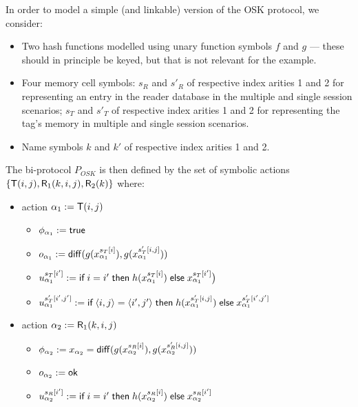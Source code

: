 \begin{example}[OSK]
  \label{ex:osk-bi-process}
  In order to model a simple (and linkable) version of the OSK protocol,
  we consider:
  \begin{itemize}
    \item Two hash functions modelled using unary function symbols 
      $f$ and $g$ --- these should in principle be keyed, but that is
      not relevant for the example.
    \item Four memory cell symbols:
      $s_R$ and $s'_R$ of respective index arities 1 and 2 for representing
      an entry in the reader database in the multiple and single session 
      scenarios;
      $s_T$ and $s'_T$ of respective index arities 1 and 2 for representing
      the tag's memory in multiple and single session scenarios.
    \item Name symbols $k$ and $k'$ of respective index arities 1 and 2.
  \end{itemize}
  The bi-protocol $P_{OSK}$ is then defined by
  the set of symbolic actions $\{\textsf{T}(i,j),\textsf{R}_1(k,i,j),\textsf{R}_2(k)\}$ where:
    \begin{itemize}
      \item action $\alpha_1 := \textsf{T}(i,j)$
        \begin{itemize}
          \item $\phi_{\alpha_1} := \textsf{true}$
          \item $o_{\alpha_1} := \mathsf{diff}(g(x_{\alpha_1}^{s_T[i]}),g(x_{\alpha_1}^{s'_T[i,j]}))$
          \item $u_{\alpha_1}^{s_T[i']} :=
              \textsf{if}\; i=i' \;\textsf{then}\; h(x_{\alpha_1}^{s_T[i]})
              \;\textsf{else}\; x_{\alpha_1}^{s_T[i']}
            \bigr)$
          \item $u_{\alpha_1}^{s'_T[i',j']} :=
              \textsf{if}\; \langle i,j \rangle = \langle i',j' \rangle
              \;\textsf{then}\; h(x_{\alpha_1}^{s'_T[i,j]})
              \;\textsf{else}\; x_{\alpha_1}^{s'_T[i',j']}$
        \end{itemize}
      \item action $\alpha_2 := \textsf{R}_1(k,i,j)$
        \begin{itemize}
          \item $\phi_{\alpha_2} := x_{\alpha_2} = \mathsf{diff}(g(x_{\alpha_2}^{s_R[i]}),g(x_{\alpha_2}^{s'_R[i,j]}))$
          \item $o_{\alpha_2} := \mathsf{ok}$
          \item $u_{\alpha_2}^{s_R[i']} :=
            \textsf{if}\; i=i' \;\textsf{then}\;
            h(x_{\alpha_2}^{s_R[i]})
            \;\textsf{else}\; x_{\alpha_2}^{s_R[i']}$

\end{itemize}
\end{itemize}
\end{example}
